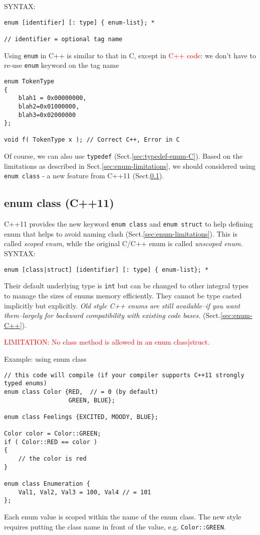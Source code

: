 SYNTAX:
\begin{verbatim}
enum [identifier] [: type] { enum-list}; *

// identifier = optional tag name
\end{verbatim}

Using \verb!enum! in C++ is similar to that in C, except in \textcolor{red}{C++
code}: we don't have to re-use \verb!enum! keyword on the tag name
\begin{lstlisting}
enum TokenType
{
    blah1 = 0x00000000,
    blah2=0x01000000,
    blah3=0x02000000
};

void f( TokenType x ); // Correct C++, Error in C
\end{lstlisting}

Of course, we can also use \verb!typedef! (Sect.\ref{sec:typedef-enum-C}).
Based on the limitations as described in Sect.\ref{sec:enum-limitations}, we
should considered using \verb!enum class! - a new feature from C++11
(Sect.\ref{sec:enum_class-C++11}).

\subsection{enum class (C++11)}
\label{sec:enum_class-C++11}

C++11 provides the new keyword \verb!enum class! and \verb!enum struct! to help
defining enum that helps to avoid naming clash
(Sect.\ref{sec:enum-limitations}).
This is called {\it scoped enum}, while the original C/C++ enum is called {\it
unscoped enum}.  SYNTAX:
\begin{verbatim}
enum [class|struct] [identifier] [: type] { enum-list}; *
\end{verbatim}

Their default underlying type is \verb!int! but can be changed to other integral types
to manage the sizes of enums memory efficiently. They cannot be type casted
implicitly but explicitly.  {\it Old style C++ enums are still available--if you
want them--largely for backward compatibility with existing code bases. }
(Sect.\ref{sec:enum-C++}).

\textcolor{red}{LIMITATION: No class method is allowed in an enum class|struct.}



Example: using enum class
\begin{verbatim}
// this code will compile (if your compiler supports C++11 strongly typed enums)
enum class Color {RED,  // = 0 (by default) 
                  GREEN, BLUE}; 
                  
enum class Feelings {EXCITED, MOODY, BLUE};

Color color = Color::GREEN;
if ( Color::RED == color )
{
    // the color is red
}

enum class Enumeration {
    Val1, Val2, Val3 = 100, Val4 // = 101
};
\end{verbatim}
Each enum value is scoped within the name of the enum class.
The new style requires putting the class name in front of the value, e.g.
\verb!Color::GREEN!.

